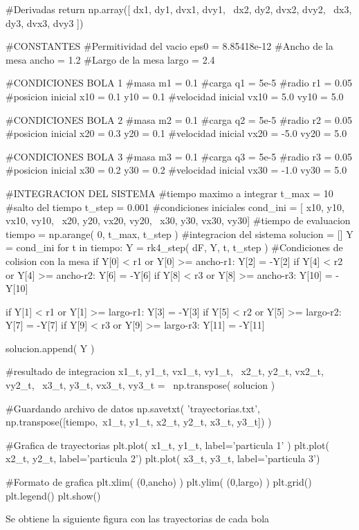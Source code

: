 \begin{listing}[style=python]
    #Derivadas
    return np.array([ dx1, dy1, dvx1, dvy1, \
    dx2, dy2, dvx2, dvy2, \
    dx3, dy3, dvx3, dvy3 ])
    

#CONSTANTES
#Permitividad del vacio
eps0 = 8.85418e-12
#Ancho de la mesa
ancho = 1.2
#Largo de la mesa
largo = 2.4

#CONDICIONES BOLA 1
#masa
m1 = 0.1
#carga
q1 = 5e-5
#radio 
r1 = 0.05
#posicion inicial
x10 = 0.1
y10 = 0.1
#velocidad inicial
vx10 = 5.0
vy10 = 5.0

#CONDICIONES BOLA 2
#masa
m2 = 0.1
#carga
q2 = 5e-5
#radio 
r2 = 0.05
#posicion inicial
x20 = 0.3
y20 = 0.1
#velocidad inicial
vx20 = -5.0
vy20 = 5.0

#CONDICIONES BOLA 3
#masa
m3 = 0.1
#carga
q3 = 5e-5
#radio 
r3 = 0.05
#posicion inicial
x30 = 0.2
y30 = 0.2
#velocidad inicial
vx30 = -1.0
vy30 = 5.0

#INTEGRACION DEL SISTEMA
#tiempo maximo a integrar
t_max = 10
#salto del tiempo
t_step = 0.001
#condiciones iniciales
cond_ini = [ x10, y10, vx10, vy10, \
x20, y20, vx20, vy20, \
x30, y30, vx30, vy30]
#tiempo de evaluacion
tiempo = np.arange( 0, t_max, t_step )
#integracion del sistema
solucion = []
Y = cond_ini
for t in tiempo:
    Y = rk4_step( dF, Y, t, t_step )
    #Condiciones de colision con la mesa
    if Y[0] < r1 or Y[0] >= ancho-r1:
	Y[2] = -Y[2]
    if Y[4] < r2 or Y[4] >= ancho-r2:
	Y[6] = -Y[6]
    if Y[8] < r3 or Y[8] >= ancho-r3:
	Y[10] = -Y[10]
	
    if Y[1] < r1 or Y[1] >= largo-r1:
	Y[3] = -Y[3]
    if Y[5] < r2 or Y[5] >= largo-r2:
	Y[7] = -Y[7]
    if Y[9] < r3 or Y[9] >= largo-r3:
	Y[11] = -Y[11]

    solucion.append( Y )

#resultado de integracion
x1_t, y1_t, vx1_t, vy1_t, \
x2_t, y2_t, vx2_t, vy2_t, \
x3_t, y3_t, vx3_t, vy3_t = \
np.transpose( solucion )

#Guardando archivo de datos
np.savetxt( 'trayectorias.txt', np.transpose([tiempo,\
x1_t, y1_t, x2_t, y2_t, x3_t, y3_t]) )

#Grafica de trayectorias
plt.plot( x1_t, y1_t, label='particula 1' )
plt.plot( x2_t, y2_t, label='particula 2')
plt.plot( x3_t, y3_t, label='particula 3')

#Formato de grafica
plt.xlim( (0,ancho) )
plt.ylim( (0,largo) )
plt.grid()
plt.legend()
plt.show()
\end{listing}

\newpage
Se obtiene la siguiente figura con las trayectorias de cada bola


